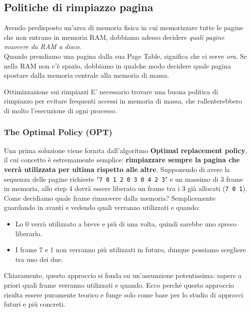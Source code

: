 \documentclass[12pt]{report}
\begin{document}
	\subsection{Politiche di rimpiazzo pagina}
	Avendo predisposto un'area di memoria fisica in cui memorizzare tutte le pagine che non entrano in memoria RAM, dobbiamo adesso decidere \textit{quali pagine muovere da RAM a disco}.\\
	Quando prendiamo una pagina dalla sua Page Table, significa che ci serve \textit{ora}. Se nella RAM non c'è spazio, dobbiamo in qualche modo decidere quale pagina spostare dalla memoria centrale alla memoria di massa.
	\begin{osservazione}{Ottimizzazione sui rimpiazzi}{}
		E' necessario trovare una buona politica di rimpiazzo per evitare frequenti accessi in memoria di massa, che rallenterebbero di molto l'esecuzione di ogni processo.
	\end{osservazione}
	
	\subsubsection*{The Optimal Policy (OPT)}
	Una prima soluzione viene fornita dall'algoritmo \textbf{Optimal replacement policy}, il cui concetto è estremamente semplice: \textbf{rimpiazzare sempre la pagina che verrà utilizzata per ultima rispetto alle altre}. Supponendo di avere la sequenza delle pagine richieste "\texttt{7 0 1 2 0 3 0 4 2 3}" e un massimo di 3 frame in memoria, allo step 4 dovrà essere liberato un frame tra i 3 già allocati (\texttt{7 0 1}). Come decidiamo quale frame rimuovere dalla memoria? Semplicemente guardando in avanti e vedendo quali verranno utilizzati e quando:
	\begin{itemize}
		\item Lo 0 verrà utilizzato a breve e più di una volta, quindi sarebbe uno spreco liberarlo.
		
		\item I frame 7 e 1 non verranno più utilizzati in futuro, dunque possiamo scegliere tra uno dei due.
	\end{itemize}
	Chiaramente, questo approccio si fonda su un'assunzione potentissima: sapere a priori quali frame verranno utilizzati e quando. Ecco perché questo approccio risulta essere puramente teorico e funge solo come base per lo studio di approcci futuri e più concreti.
	
\end{document}
